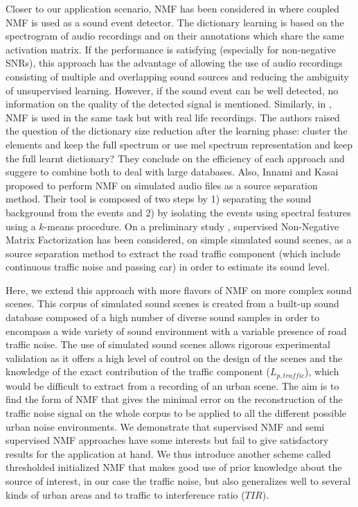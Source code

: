 \documentclass[twocolumn]{svjour3}          %
\begin{document}
Closer to our application scenario, NMF has been considered in \cite{dikmen2013sound} where coupled NMF is used as a sound event detector. The dictionary learning is based on the spectrogram of audio recordings and on their annotations which share the same activation matrix. If the performance is satisfying (especially for non-negative SNRs), this approach has the advantage of allowing the use of audio recordings consisting of multiple and overlapping sound sources and reducing the ambiguity of unsupervised learning. However, if the sound event can be well detected, no information on the quality of the detected signal is mentioned. 
Similarly, in \cite{mesaros_sound_2015}, NMF is used in the same task but with real life recordings. The authors raised the question of the dictionary size reduction after the learning phase: cluster the elements and keep the full spectrum or use mel spectrum representation and keep the full learnt dictionary? They conclude on the efficiency of each approach and suggere to combine both to deal with large databases. Also, Innami and Kasai \cite{satoshi_innami_nmf-based_2012} proposed to perform NMF on simulated audio files as a source separation method. Their tool is composed of two steps by 1) separating the sound background from the events and 2) by isolating the events using spectral features using a $k$-means procedure.
On a preliminary study \cite{gloaguen2016estimating}, supervised Non-Negative Matrix Factorization has been considered, on simple simulated sound scenes, as a source separation method to extract the road traffic component (which include continuous traffic noise and passing car) in order to estimate its sound level.


Here, we extend this approach with more flavors of NMF on more complex sound scenes. This corpus of simulated sound scenes is created from a built-up sound database composed of a high number of diverse sound samples in order to encompass a wide variety of sound environment with a variable presence of road traffic noise. The use of simulated sound scenes allows rigorous experimental validation as it offers a high level of control on the design of the scenes and the knowledge of the exact contribution of the traffic component ($L_{p,traffic}$), which would be difficult to extract from a recording of an urban scene.
The aim is to find the form of NMF that gives the minimal error on the reconstruction of the traffic noise signal on the whole corpus to be applied to all the different possible urban noise environments.
We demonstrate that supervised NMF and semi supervised NMF approaches have some interests but fail to give satisfactory results for the application at hand. We thus introduce another scheme called thresholded initialized NMF that makes good use of prior knowledge about the source of interest, in our case the traffic noise, but also generalizes well to several kinds of urban areas and to traffic to interference ratio ($TIR$).
\end{document}

